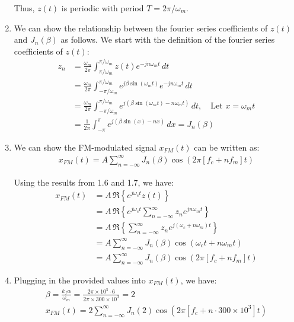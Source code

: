\documentclass{article}
\begin{document}
\begin{enumerate}[label=1.\arabic*]
    Thus, $z(t)$ is periodic with period $T = 2\pi/\omega_m$.

    \item We can show the relationship between the fourier series coefficients of $z(t)$ and $J_n(\beta)$ as follows. We start with the definition of the fourier series coefficients of $z(t)$:
    \begin{align*}
        z_n &= \frac{\omega_m}{2\pi} \int_{\pi/\omega_m}^{\pi/\omega_m} z(t) e^{-jn\omega_m t} \, dt \\
        &= \frac{\omega_m}{2\pi} \int_{-\pi/\omega_m}^{\pi/\omega_m} e^{j\beta\sin(\omega_m t)} e^{-jn\omega_m t} \, dt \\
        &= \frac{\omega_m}{2\pi} \int_{-\pi/\omega_m}^{\pi/\omega_m} e^{j(\beta\sin(\omega_m t) - n\omega_m t)} \, dt, \quad \text{Let } x = \omega_m t \\
        &= \frac{1}{2\pi} \int_{-\pi}^{\pi} e^{j(\beta\sin(x) - nx)} \, dx = J_n(\beta)
    \end{align*}

    \item We can show the FM-modulated signal $x_{FM}(t)$ can be written as:
    \begin{align*}
        x_{FM}(t) = A \sum_{n=-\infty}^{\infty} J_n(\beta) \cos\left(2\pi\left[f_c+nf_m\right]t\right)
    \end{align*}

    Using the results from 1.6 and 1.7, we have:
    \begin{align*}
        x_{FM}(t) &= A \, \mathfrak{R}\left\{e^{j\omega_c t} z(t)\right\} \\
        &= A \, \mathfrak{R}\left\{e^{j\omega_c t} \sum_{n=-\infty}^{\infty} z_n e^{jn\omega_m t}\right\} \\
        &= A \, \mathfrak{R}\left\{\sum_{n=-\infty}^{\infty} z_n e^{j(\omega_c + n\omega_m)t}\right\} \\
        &= A \sum_{n=-\infty}^{\infty} J_n(\beta) \cos\left(\omega_ct + n\omega_mt\right) \\
        &= A \sum_{n=-\infty}^{\infty} J_n(\beta) \cos\left(2\pi\left[f_c+nf_m\right]t\right)
    \end{align*}

    \item Plugging in the provided values into $x_{FM}(t)$, we have:
    \begin{align*}
        \beta = \frac{k_f \alpha}{\omega_m} = \frac{2\pi \times 10^5 \cdot 6}{2\pi \times 300 \times 10^3} = 2 \\
        x_{FM}(t) = 2\sum_{n=-\infty}^{\infty} J_n(2) \cos\left(2\pi\left[f_c + n\cdot 300 \times 10^3\right]t\right)
    \end{align*}


\end{enumerate}
\end{document}
